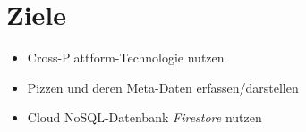\section{Ziele}

\begin{itemize}
    \itemsep-0.4em
    \item Cross-Plattform-Technologie nutzen
    \item Pizzen und deren Meta-Daten erfassen/darstellen
    \item Cloud NoSQL-Datenbank \textit{Firestore} nutzen
\end{itemize}
